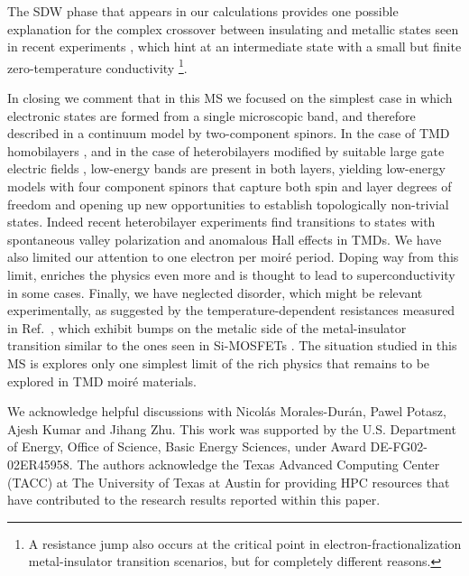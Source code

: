 \documentclass[%
 reprint,
 superscriptaddress,
 amsmath,amssymb,
 aps,
 prx,
 floatfix,
]{revtex4-2}
\newcommand{\<}{\langle}
\renewcommand{\>}{\rangle}
\renewcommand{\(}{\left(}
\renewcommand{\)}{\right)}
\renewcommand{\[}{\left[}
\renewcommand{\]}{\right]}
\begin{document}
The SDW phase that appears in our calculations provides one possible explanation for the
complex crossover between insulating and metallic states seen in recent experiments  \cite{mak2021continuousMIT,dean2021quantumcritical},
which hint at an intermediate state with a small but finite zero-temperature
conductivity \footnote{A resistance jump also occurs at the critical point in electron-fractionalization \cite{senthil2008mit,xu2021metal} metal-insulator transition scenarios, but 
for completely different reasons.}.

In closing we comment that in this MS we focused on the simplest case in which electronic states are formed from a single 
microscopic band, and therefore described in a continuum model by two-component spinors.  In the case of 
TMD homobilayers \cite{PhysRevLett.122.086402,pan2020band,zang2021hartree,devakul2021magic}, and in the case of heterobilayers modified by suitable large gate electric fields \cite{zhang2021spin}, low-energy 
bands are present in both layers, yielding low-energy models with four component spinors that capture
both spin and layer degrees of freedom and opening up new opportunities to establish topologically non-trivial states.  Indeed recent heterobilayer experiments  \cite{li2021quantum} find transitions to states with spontaneous valley polarization and 
anomalous Hall effects in TMDs.  We have also limited our attention to one electron per moir\'e period.  
Doping way from this limit, enriches the physics even more and is thought to lead to superconductivity in some cases.
Finally, we have neglected disorder, which might be relevant experimentally, as suggested by the temperature-dependent 
resistances measured in Ref.~\cite{mak2021continuousMIT}, which exhibit 
bumps on the metalic side of the metal-insulator transition similar to the ones seen in Si-MOSFETs \cite{finkelstein2001silicon}.
The situation studied in this MS is explores only one simplest limit of the rich physics 
that remains to be explored in TMD moir\'e materials.  

\begin{acknowledgments}
We acknowledge helpful discussions with Nicol\'as Morales-Dur\'an, Pawel Potasz, Ajesh Kumar and Jihang Zhu. 
This work was supported by the U.S. Department of Energy, Office of Science, Basic Energy Sciences, under Award DE-FG02-02ER45958. The authors acknowledge the Texas Advanced Computing Center (TACC) at The University of Texas at Austin for providing HPC resources that have contributed to the research results reported within this paper.
\end{acknowledgments}
\end{document}
